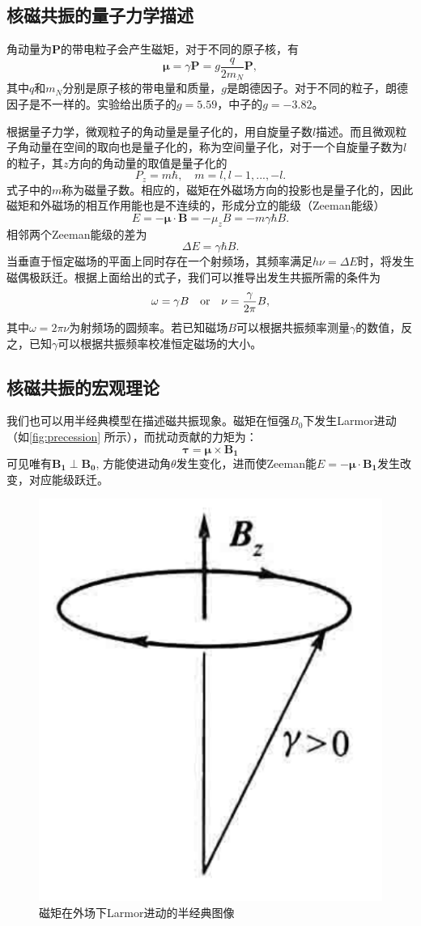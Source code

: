\documentclass[font=default]{mpltx}
\begin{document}
\subsection{核磁共振的量子力学描述}
角动量为$\bm{P}$的带电粒子会产生磁矩，对于不同的原子核，有\begin{equation}\bm{\mu}=\gamma\bm{P}=g\frac{q}{2m_N}\bm{P},\end{equation}其中$q$和$m_N$分别是原子核的带电量和质量，$g$是朗德因子。对于不同的粒子，朗德因子是不一样的。实验给出质子的$g=5.59$，中子的$g=-3.82$。

根据量子力学，微观粒子的角动量是量子化的，用自旋量子数$l$描述。而且微观粒子角动量在空间的取向也是量子化的，称为空间量子化，对于一个自旋量子数为$l$的粒子，其$z$方向的角动量的取值是量子化的\begin{equation}P_z=m\hbar, \quad m=l,l-1,...,-l.\end{equation}式子中的$m$称为磁量子数。相应的，磁矩在外磁场方向的投影也是量子化的，因此磁矩和外磁场的相互作用能也是不连续的，形成分立的能级（Zeeman能级）\begin{equation}E=-\bm{\mu}\cdot\bm{B}=-\mu_z B=-m\gamma \hbar B.\end{equation}相邻两个Zeeman能级的差为\begin{equation}\Delta E=\gamma \hbar B.\end{equation}当垂直于恒定磁场的平面上同时存在一个射频场，其频率满足$h\nu=\Delta E$时，将发生磁偶极跃迁。根据上面给出的式子，我们可以推导出发生共振所需的条件为\begin{equation}\label{eq:resonance_simplified}
  \omega=\gamma B\quad{\rm or}\quad \nu=\frac{\gamma}{2\pi}B,
\end{equation}其中$\omega=2\pi\nu$为射频场的圆频率。若已知磁场$B$可以根据共振频率测量$\gamma$的数值，反之，已知$\gamma$可以根据共振频率校准恒定磁场的大小。

\subsection{核磁共振的宏观理论}
我们也可以用半经典模型在描述磁共振现象。磁矩在恒强$B_0$下发生Larmor进动（如\autoref{fig:precession} 所示），而扰动贡献的力矩为：
\begin{equation}
  \bm{\tau} = \bm{\mu}\times\bm{B_1}
\end{equation}
可见唯有$\bm{B_1}\perp\bm{B_0}$, 方能使进动角$\theta$发生变化，进而使Zeeman能$E = -\bm{\mu}\cdot\bm{B_1}$发生改变，对应能级跃迁。
\begin{figure}
  \centering
  \includegraphics[width=0.2\linewidth]{fig/precession.png}
  \caption{磁矩在外场下Larmor进动的半经典图像}
  \label{fig:precession}
\end{figure}
\end{document}
